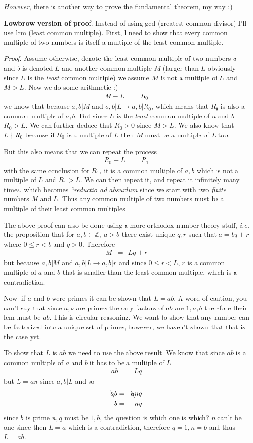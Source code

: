\documentclass[aps,preprint,preprintnumbers,nofootinbib,showpacs,prd]{revtex4-1}
\newcommand{\ie}{{\it i.e.} }
\newcommand{\nbea}{\begin{eqnarray*}}
\newcommand{\neea}{\end{eqnarray*}}
\begin{document}
\underline{\textit{However}}, there is another way to prove the fundamental theorem, my way :)

{\bf Lowbrow version of proof}. Instead of using gcd (greatest common divisor) I'll use lcm (least common multiple). First, I need to show that every common multiple of two numbers is itself a multiple of the least common multiple.

{\it Proof}. Assume otherwise, denote the least common multiple of two numbers $a$ and $b$ is denoted $L$ and another common multiple $M$ (larger than $L$ obviously since $L$ is the {\it least} common multiple) we assume $M$ is not a multiple of $L$ and $M > L$. Now we do some arithmetic :)
%
\nbea
M - L & = & R_0
\neea
%
we know that because $a,b|M$ and $a,b|L \longrightarrow a,b|R_0$, which means that $R_0$ is also a common multiple of $a,b$. But since $L$ is the {\it least} common multiple of $a$ and $b$, $R_0 > L$. We can further deduce that $R_0 > 0$ since $M > L$. We also know that $L \nmid R_0$ because if $R_0$ is a multiple of $L$ then $M$ must be a multiple of $L$ too.

But this also means that we can repeat the process
%
\nbea
R_0 - L & = & R_1
\neea
%
with the same conclusion for $R_1$, it is a common multiple of $a,b$ which is not a multiple of $L$ and $R_1 > L$. We can then repeat it, and repeat it infinitely many times, which becomes {\it ``reductio ad absurdum} since we start with two {\it finite} numbers $M$ and $L$. Thus any common multiple of two numbers must be a multiple of their least common multiples.

The above proof can also be done using a more orthodox number theory stuff, \ie the proposition that for $a,b \in \mathbb{Z}, ~a>b$ there exist unique $q, r$ such that $a = bq + r$ where $0 \le r < b$ and $q > 0$. Therefore
%
\nbea
M & = & Lq + r
\neea
%
but because $a,b|M$ and $a,b|L \longrightarrow a,b|r$ and since $0 \le r < L$, $r$ is a common multiple of $a$ and $b$ that is smaller than the least common multiple, which is a contradiction.

Now, if $a$ and $b$ were primes it can be shown that $L=ab$. A word of caution, you can't say that since $a,b$ are primes the only factors of $ab$ are $1,a,b$ therefore their lcm must be $ab$. This is circular reasoning. We want to show that any number can be factorized into a unique set of primes, however, we haven't shown that that is the case yet.

To show that $L$ is $ab$ we need to use the above result. We know that since $ab$ is a common multiple of $a$ and $b$ it has to be a multiple of $L$
%
\nbea
ab & = & Lq
\neea
%
but $L = an$ since $a,b|L$ and so
%
\nbea
\bcancel{a}b & = & \bcancel{a}nq \\
b & = & nq
\neea
%
since $b$ is prime $n,q$ must be $1,b$, the question is which one is which? $n$ can't be one since then $L=a$ which is a contradiction, therefore $q=1, n=b$ and thus $L=ab$.
\end{document}
